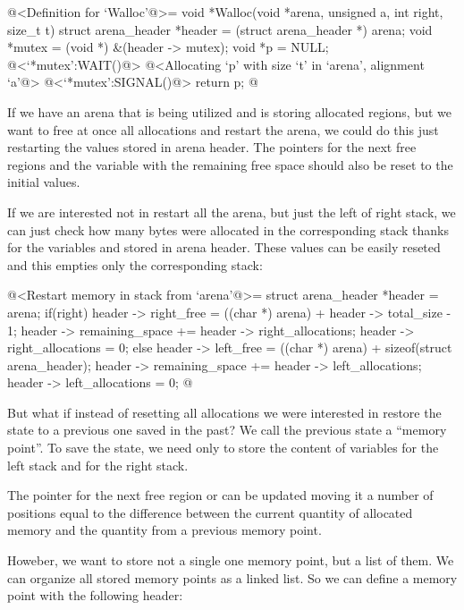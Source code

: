 \iniciocodigo
@<Definition for `Walloc'@>=
void *Walloc(void *arena, unsigned a, int right, size_t t){
  struct arena_header *header = (struct arena_header *) arena;
  void *mutex = (void *) &(header -> mutex);
  void *p = NULL;
  @<`*mutex':WAIT()@>
  @<Allocating `p' with size `t' in `arena', alignment `a'@>
  @<`*mutex':SIGNAL()@>
  return p;
}
@
\fimcodigo


If we have an arena that is being utilized and is storing allocated
regions, but we want to free at once all allocations and restart the
arena, we could do this just restarting the values stored in arena
header. The pointers for the next free regions and the variable with
the remaining free space should also be reset to the initial values.

If we are interested not in restart all the arena, but just the left
of right stack, we can just check how many bytes were allocated in the
corresponding stack thanks for the
variables 
and  stored in arena header. These
values can be easily reseted and this empties only the corresponding
stack:


\iniciocodigo
@<Restart memory in stack from `arena'@>=
{
  struct arena_header *header = arena;
  if(right){
    header -> right_free = ((char *) arena) + header -> total_size - 1;
    header -> remaining_space += header -> right_allocations;
    header -> right_allocations = 0;
  }
  else{
    header -> left_free = ((char *) arena) + sizeof(struct arena_header);
    header -> remaining_space += header -> left_allocations;
    header -> left_allocations = 0;
  }
}
@
\fimcodigo

But what if instead of resetting all allocations we were interested in
restore the state to a previous one saved in the past? We call the
previous state a ``memory point''. To save the state, we need only to
store the content of variables  for the
left stack and  for the right stack.

The pointer for the next free region 
or  can be updated moving it a number of
positions equal to the difference between the current quantity of
allocated memory and the quantity from a previous memory point.

Howeber, we want to store not a single one memory point, but a list of
them. We can organize all stored memory points as a linked list. So we
can define a memory point with the following header:

